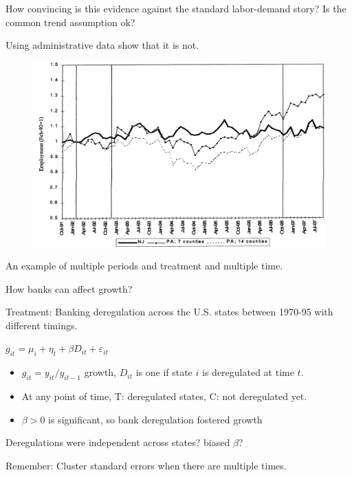 \documentclass{beamer}
\begin{document}
\begin{frame}{\cite{card2000minimum}}
How convincing is this evidence against the standard labor-demand story? Is the common trend assumption ok?\medskip

Using administrative data \cite{card2000minimum} show that it is not.
\begin{figure}
\centering
\includegraphics[width=0.75\linewidth]{./Figures/card-krueger2}
\end{figure}

\end{frame}


\begin{frame}{\cite{jayaratne1996finance}}
	An example of multiple periods and treatment and multiple time.\medskip
	
	How banks can affect growth?\medskip
	
	Treatment: Banking deregulation across the U.S. states between 1970-95 with different timings.
	\begin{center}
		$g_{it}=\mu_i+\eta_t+\beta D_{it}+\varepsilon_{it}$
	\end{center}
	
	\begin{itemize}
		\item $g_{it}=y_{it}/y_{it-1}$ growth, $D_{it}$ is one if state $i$ is deregulated at time $t$.
		\item At any point of time, T: deregulated states, C: not deregulated yet.
		\item $\beta>0$ is significant, so bank deregulation fostered growth 
	\end{itemize}
	Deregulations were independent across states? biased $\beta$?\medskip
	
	Remember: Cluster standard errors when there are multiple times.
\end{frame}
\end{document}
